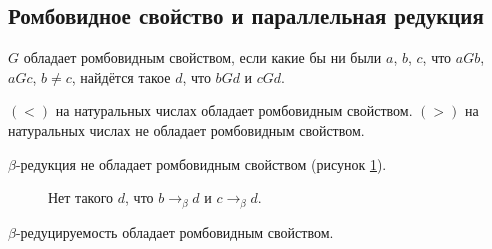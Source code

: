 \subsection{\texorpdfstring{Ромбовидное свойство и параллельная редукция}{Diamond property and parallel reduction}}

\begin{definition}
    $G$ обладает ромбовидным свойством, если какие бы ни были $a$, $b$, $c$, что $aGb$, $aGc$, $b \ne c$, найдётся такое $d$, что $bGd$ и $cGd$.
\end{definition}

\begin{example}
    $(<)$ на натуральных числах обладает ромбовидным свойством.
    $(>)$ на натуральных числах не обладает ромбовидным свойством.

$\beta$-редукция не обладает ромбовидным свойством (рисунок \ref{no-diamond}).
\begin{figure}[ht]
    \centering
    \caption{Нет такого $d$, что $b \rightarrow_{\beta} d$ и $c \rightarrow_{\beta} d$.}
    \label{no-diamond}
\end{figure}
\end{example}

\begin{theorem} \label{church-rosser}
    $\beta$-редуцируемость обладает ромбовидным свойством.
\end{theorem}

